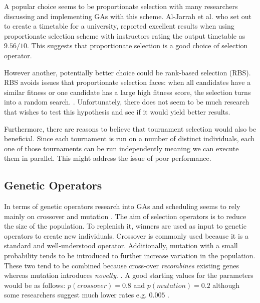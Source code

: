 \documentclass[a4paper, 12pt, titlepage]{article}
\begin{document}
A popular choice seems to be proportionate selection with
many researchers discussing and implementing GAs with this
scheme. \cite{timilsina2015, yu2002, aljarrah2017, mesghouni2004}
Al-Jarrah et al. who set out to create a timetable for a university, reported
excellent results when using proportionate selection scheme
with instructors rating the output timetable as \(9.56/10\).
This suggests that proportionate selection is a good choice of selection operator.

However another, potentially better choice could be rank-based
selection (RBS).  RBS avoids issues that proportionate selection faces:
when all candidates have a similar fitness or one candidate has a
large high fitness score, the selection turns into a random search.
\cite[p.~23]{floreano2008}. Unfortunately, there does not seem to be
much research that wishes to test this hypothesis and see if it would
yield better results.

Furthermore, there are reasons to believe that tournament selection would
also be beneficial.  Since each tournament is run on a number of distinct
individuals, each one of those tournaments can be run independently
meaning we can execute them in parallel. This might address the issue
of poor performance. 

\subsection*{Genetic Operators}

In terms of genetic operators research into GAs and scheduling seems
to rely mainly on crossover and mutation \cite{yu2002, aljarrah2017,
mesghouni2004, hosseinabadi2018, solanki2015, timilsina2015, may2015}.
The aim of selection operators is to reduce the size of the population. To
replenish it, winners are used as input to genetic operators to create
new individuals.  Crossover is commonly used because it is a standard and
well-understood operator. Additionally, mutation with a small probability
tends to be introduced to further increase variation in the population.
These two tend to be combined because cross-over \emph{recombines}
existing genes whereas mutation introduces \emph{novelty}.
\cite[p.~27]{heaton2014}.  A good starting values for the parameters would
be as follows: \(p(crossover) = 0.8\) \cite[p.~117]{eberhart2007} and
\(p(mutation) = 0.2\) \cite[p.~25]{heaton2014} although some researchers
suggest much lower rates e.g. \(0.005\) \cite[p.~117]{eberhart2007}.
\end{document}
